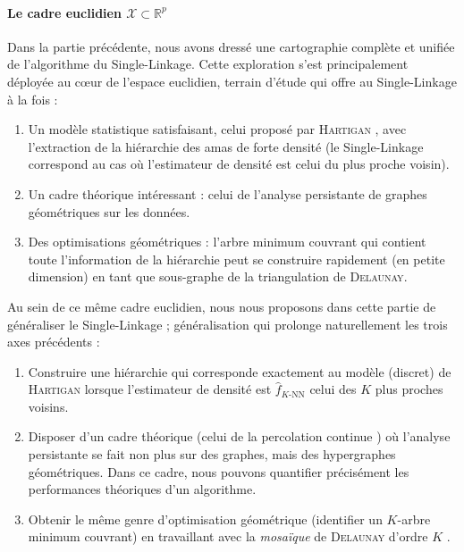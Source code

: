 \documentclass{these-ISSS} %
\begin{document}
\paragraph{Le cadre euclidien $\mathcal X \subset \mathbb R^p$}
Dans la partie précédente, nous avons dressé une cartographie complète et unifiée de l'algorithme du Single-Linkage.
Cette exploration s'est principalement déployée au cœur de l'espace euclidien, terrain d'étude qui offre au Single-Linkage à la fois :
\begin{enumerate}
    \item Un modèle statistique satisfaisant, celui proposé par \textsc{Hartigan} \cite{hartigan81}, avec l'extraction de la hiérarchie des amas de forte densité (le Single-Linkage correspond au cas où l'estimateur de densité est celui du plus proche voisin).
    \item Un cadre théorique intéressant : celui de l'analyse persistante de graphes géométriques sur les données.
    \item Des optimisations géométriques : l'arbre minimum couvrant qui contient toute l'information de la hiérarchie peut se construire rapidement (en petite dimension) en tant que sous-graphe de la triangulation de \textsc{Delaunay}.
\end{enumerate}

Au sein de ce même cadre euclidien, nous nous proposons dans cette partie de généraliser le Single-Linkage ; généralisation qui prolonge naturellement les trois axes précédents :
\begin{enumerate}
    \item Construire une hiérarchie qui corresponde exactement au modèle (discret) de \textsc{Hartigan} lorsque l'estimateur de densité est $\widehat f_{K\text{-NN}}$ celui des $K$ plus proches voisins.
    \item Disposer d'un cadre théorique (celui de la percolation continue \cite{MeesterRoy, penrose2003}) où l'analyse persistante se fait non plus sur des graphes, mais des hypergraphes géométriques. Dans ce cadre, nous pouvons quantifier précisément les performances théoriques d'un algorithme.
    \item Obtenir le même genre d'optimisation géométrique (identifier un $K$-arbre minimum couvrant) en travaillant avec la \emph{mosaïque} de \textsc{Delaunay} d'ordre $K$ \cite{osangEdelsbrunner2023algorithm}.
\end{enumerate}
\end{document}
